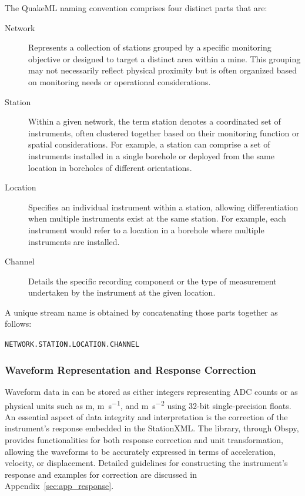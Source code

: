 The QuakeML naming convention comprises four distinct parts that are:

\begin{description}
  \item[Network] Represents a collection of stations grouped by a specific monitoring objective or designed to target a distinct area within a mine. This grouping may not necessarily reflect physical proximity but is often organized based on monitoring needs or operational considerations.
  \item[Station] Within a given network, the term station denotes a coordinated set of instruments, often clustered together based on their monitoring function or spatial considerations. For example, a station can comprise a set of instruments installed in a single borehole or deployed from the same location in boreholes of different orientations.
  \item[Location] Specifies an individual instrument within a station, allowing differentiation when multiple instruments exist at the same station. For example, each instrument would refer to a location in a borehole where multiple instruments are installed.
  \item[Channel] Details the specific recording component or the type of measurement undertaken by the instrument at the given location.
\end{description}

A unique stream name is obtained by concatenating those parts together as follows:
\begin{center}
\texttt{NETWORK.STATION.LOCATION.CHANNEL}
\end{center}

\subsubsection{Waveform Representation and Response Correction}

Waveform data in \museismic can be stored as either integers representing ADC counts or as physical units such as \si{\meter}, \si{\meter\per\second}, and \si{\meter\per\second\squared} using 32-bit single-precision floats. An essential aspect of data integrity and interpretation is the correction of the instrument's response embedded in the StationXML. The \muquake library, through Obspy, provides functionalities for both response correction and unit transformation, allowing the waveforms to be accurately expressed in terms of acceleration, velocity, or displacement. Detailed guidelines for constructing the instrument's response and examples for correction are discussed in Appendix~\ref{sec:app_response}.

